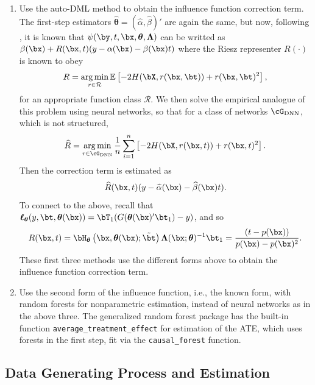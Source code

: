 \documentclass[12pt]{article}
\numberwithin{equation}{section}
\theoremstyle{definition}
\newcommand{\sumi}{\sum_{i=1}^n}
\DeclareMathOperator*{\argmin}{arg\,min}
\newcommand{\E}{\mathbb{E}}
\newcommand{\btheta}{\boldsymbol{\theta}}
\newcommand{\bL}{\boldsymbol{\Lambda}}
\newcommand{\btstar}{\tilde{\bt}}
\newcommand{\bthat}{\bm{\widehat{\theta}}}
\newcommand{\ahat}{\widehat{\alpha}}
\newcommand{\bhat}{\widehat{\beta}}
\begin{document}
\begin{appendices}
\begin{enumerate}
    
    \item Use the auto-DML method to obtain the influence function correction term. The first-step estimators $\bthat = (\ahat, \bhat)'$ are again the same, but now, following \cite{Chernozhukov-etal2024_WP}, it is known that $\psi(\by,t,\bx, \btheta, \bL)$ can be writted as $\beta(\bx) + R(\bx,t) (y - \alpha(\bx) - \beta(\bx) t)$ where the Riesz representer $R(\cdot)$ is known to obey
    \[
        R = \argmin_{r \in \mathcal{R}} \E\left[ -2 H(\bX, r(\bx, \bt)) + r(\bx,\bt)^2 \right],
    \]
    for an appropriate function class $\mathcal{R}$. We then solve the empirical analogue of this problem using neural networks, so that for a class of networks $\cG_{\rm DNN}$, which is not structured,
    \[
        \widehat{R} = \argmin_{r \in \cG_{\rm DNN}} \frac{1}{n}\sumi \left[ -2 H(\bX, r(\bx, t)) + r(\bx,t)^2 \right].
    \]
    Then the correction term is estimated as
    \[
        \widehat{R}(\bx,t) (y - \ahat(\bx) - \bhat(\bx) t ).
    \]
    To connect to the above, recall that $\bm{\ell}_{\btheta}(y,\bt, \btheta(\bx)) =  \bT_1(G(\btheta(\bx)'\bt_1)-y)$, and so
    \[
        R(\bx,t) = \bH_{\btheta}\left(\bx, \btheta(\bx ); \btstar\right) \bL(\bx; \btheta)^{-1}\bt_1 = \frac{ ( t - p(\bx) )  }{p(\bx) - p(\bx)^2}.
    \]
    These first three methods use the different forms above to obtain the influence function correction term. 


    \item Use the second form of the influence function, i.e., the known form, with random forests for nonparametric estimation, instead of neural networks as in the above three. The generalized random forest package \citep{Athey-Tibshirani-Wager2019_AoS} has the built-in function \verb|average_treatment_effect| for estimation of the ATE, which uses forests in the first step, fit via the \verb|causal_forest| function. 
    
\end{enumerate}







\subsection{Data Generating Process and Estimation}



\end{appendices}
\end{document}
